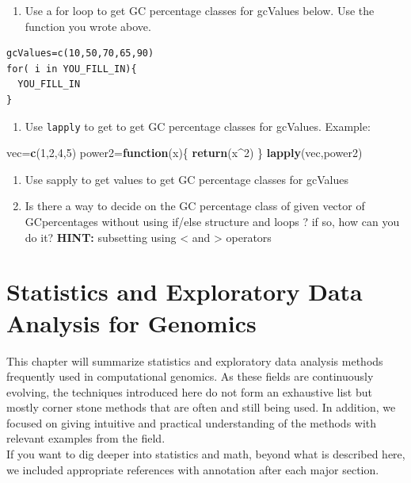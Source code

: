 \documentclass[12pt,]{krantz}
\newenvironment{Shaded}{\begin{snugshade}}{\end{snugshade}}
\newcommand{\ControlFlowTok}[1]{\textcolor[rgb]{0.13,0.29,0.53}{\textbf{#1}}}
\newcommand{\DecValTok}[1]{\textcolor[rgb]{0.00,0.00,0.81}{#1}}
\newcommand{\KeywordTok}[1]{\textcolor[rgb]{0.13,0.29,0.53}{\textbf{#1}}}
\newcommand{\NormalTok}[1]{#1}
\newcommand{\OperatorTok}[1]{\textcolor[rgb]{0.81,0.36,0.00}{\textbf{#1}}}
\providecommand{\tightlist}{%
  \setlength{\itemsep}{0pt}\setlength{\parskip}{0pt}}
\theoremstyle{definition}
\theoremstyle{definition}
\theoremstyle{definition}
\theoremstyle{remark}
\begin{document}
\begin{enumerate}
\def\labelenumi{\arabic{enumi}.}
\setcounter{enumi}{43}
\tightlist
\item
  Use a for loop to get GC percentage classes for gcValues below. Use
  the function you wrote above.
\end{enumerate}

\begin{verbatim}
gcValues=c(10,50,70,65,90)
for( i in YOU_FILL_IN){
  YOU_FILL_IN
}
\end{verbatim}

\begin{enumerate}
\def\labelenumi{\arabic{enumi}.}
\setcounter{enumi}{43}
\tightlist
\item
  Use \texttt{lapply} to get to get GC percentage classes for gcValues.
  Example:
\end{enumerate}

\begin{Shaded}
\begin{Highlighting}[]
\NormalTok{vec=}\KeywordTok{c}\NormalTok{(}\DecValTok{1}\NormalTok{,}\DecValTok{2}\NormalTok{,}\DecValTok{4}\NormalTok{,}\DecValTok{5}\NormalTok{)}
\NormalTok{power2=}\ControlFlowTok{function}\NormalTok{(x)\{ }\KeywordTok{return}\NormalTok{(x}\OperatorTok{^}\DecValTok{2}\NormalTok{)  \}}
    \KeywordTok{lapply}\NormalTok{(vec,power2)}
\end{Highlighting}
\end{Shaded}

\begin{enumerate}
\def\labelenumi{\arabic{enumi}.}
\setcounter{enumi}{43}
\item
  Use sapply to get values to get GC percentage classes for gcValues
\item
  Is there a way to decide on the GC percentage class of given vector of
  GCpercentages without using if/else structure and loops ? if so, how
  can you do it? \textbf{HINT:} subsetting using \textless{} and
  \textgreater{} operators
\end{enumerate}

\hypertarget{stats}{%
\chapter{Statistics and Exploratory Data Analysis for
Genomics}\label{stats}}

This chapter will summarize statistics and exploratory data analysis
methods frequently used in computational genomics. As these fields are
continuously evolving, the techniques introduced here do not form an
exhaustive list but mostly corner stone methods that are often and still
being used. In addition, we focused on giving intuitive and practical
understanding of the methods with relevant examples from the field.\\
If you want to dig deeper into statistics and math, beyond what is
described here, we included appropriate references with annotation after
each major section.
\end{document}
